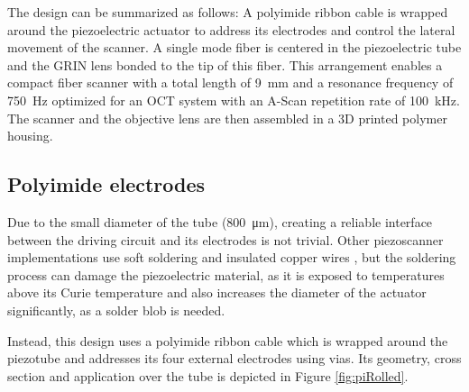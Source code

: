 \documentclass[10pt]{iopart}
\begin{document}
The design can be summarized as follows: A polyimide ribbon cable is wrapped around the piezoelectric actuator to address its electrodes and control the lateral movement of the scanner. A single mode fiber is centered in the piezoelectric tube and the GRIN lens bonded to the tip of this fiber. This arrangement enables a compact fiber scanner with a total length of \SI{9}{\milli\meter} and a resonance frequency of \SI{750}{\hertz} optimized for an OCT system with an A-Scan repetition rate of \SI{100}{\kilo\hertz}. The scanner and the objective lens are then assembled in a 3D printed polymer housing.

\subsection{Polyimide electrodes}

Due to the small diameter of the tube (\SI{800}{\micro\meter}), creating a reliable interface between the driving circuit and its electrodes is not trivial. Other piezoscanner implementations use soft soldering and insulated copper wires \cite{Lee2010, Meinert, Huo2010}, but the soldering process can damage the piezoelectric material, as it is exposed to temperatures above its Curie temperature and also increases the diameter of the actuator significantly, as a solder blob is needed. %

Instead, this design uses a polyimide ribbon cable which is wrapped around the piezotube and addresses its four external electrodes using vias. Its geometry, cross section and application over the tube is depicted in Figure \ref{fig:piRolled}.
\end{document}
